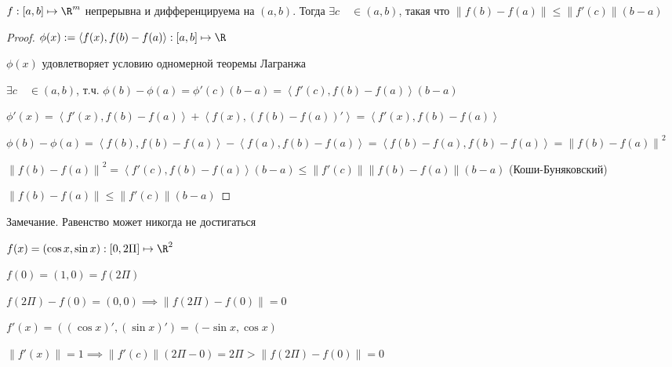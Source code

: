 
\begin{theorem} \thmslashn

    $f : [a, b] \mapsto \R^m$ непрерывна и дифференцируема на $(a, b)$. Тогда $\exists{c}\quad \in (a, b)$, такая что $\left\| f(b) - f(a) \right\| \le \left\| f'(c)\right\|(b - a)$
    \begin{proof} \thmslashn

	$\phi(x) := \left< f(x), f(b) - f(a)\right> : [a, b] \mapsto \R$

	$\phi(x)$ удовлетворяет условию одномерной теоремы Лагранжа

	$\exists{c} \quad \in (a, b)$, т.ч. $\phi(b) - \phi(a) = \phi'(c)(b - a) = \left< f'(c), f(b) - f(a)\right>(b - a)$

	$\phi'(x) = \left< f'(x), f(b) - f(a)\right> + \left< f(x), (f(b) - f(a))'\right> = \left< f'(x), f(b) - f(a)\right>$

        $\phi(b) - \phi(a) = \left< f(b), f(b) - f(a)\right> - \left< f(a), f(b) - f(a)\right> = \left< f(b) - f(a), f(b) - f(a)\right> = \left\| f(b) - f(a) \right\|^2$

        $\left\| f(b) - f(a) \right\|^2 = \left< f'(c), f(b) - f(a)\right>(b - a) \le \left\| f'(c) \right\| \left\| f(b) - f(a) \right\| (b - a)$ (Коши-Буняковский)

        $\left\| f(b) - f(a)\right\| \le \left\| f'(c) \right\|(b - a)$
    \end{proof}
    \item Замечание. Равенство может никогда не достигаться 

	$f(x) = (\cos{x}, \sin{x}) : [0, 2\Pi] \mapsto \R^2$
 
	$f(0) = (1, 0) = f(2\Pi)$

	$f(2\Pi) - f(0) = (0, 0) \implies \left\| f(2\Pi) - f(0) \right\| = 0$

	$f'(x) = ((\cos{x})', (\sin{x})') = (-\sin{x}, \cos{x})$

	$\left\| f'(x) \right\| = 1 \implies \left\| f'(c) \right\| (2\Pi - 0) = 2\Pi > \left\| f(2\Pi) - f(0) \right\| = 0$

\end{theorem}

